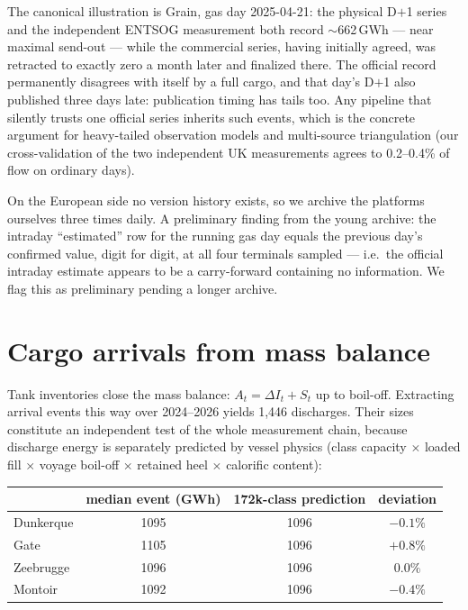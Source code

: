 \documentclass[11pt]{article}
\begin{document}
The canonical illustration is Grain, gas day 2025-04-21: the physical D$+$1
series and the independent ENTSOG measurement both record $\sim$662\,GWh
--- near maximal send-out --- while the commercial series, having initially
agreed, was retracted to exactly zero a month later and finalized there.
The official record permanently disagrees with itself by a full cargo, and
that day's D$+$1 also published three days late: publication timing has
tails too. Any pipeline that silently trusts one official series inherits
such events, which is the concrete argument for heavy-tailed observation
models and multi-source triangulation (our cross-validation of the two
independent UK measurements agrees to 0.2--0.4\% of flow on ordinary
days).

On the European side no version history exists, so we archive the
platforms ourselves three times daily. A preliminary finding from the
young archive: the intraday ``estimated'' row for the running gas day
equals the previous day's confirmed value, digit for digit, at all four
terminals sampled --- i.e.\ the official intraday estimate appears to be a
carry-forward containing no information. We flag this as preliminary
pending a longer archive.

\section{Cargo arrivals from mass balance}
\label{sec:arrivals}
Tank inventories close the mass balance: $A_t = \Delta I_t + S_t$ up to
boil-off. Extracting arrival events this way over 2024--2026 yields
1{,}446 discharges. Their sizes constitute an independent test of the
whole measurement chain, because discharge energy is separately predicted
by vessel physics (class capacity $\times$ loaded fill $\times$ voyage
boil-off $\times$ retained heel $\times$ calorific content):

\begin{center}\small
\begin{tabular}{lccc}
\toprule
& median event (GWh) & 172k-class prediction & deviation \\
\midrule
Dunkerque & 1095 & 1096 & $-0.1\%$ \\
Gate & 1105 & 1096 & $+0.8\%$ \\
Zeebrugge & 1096 & 1096 & $0.0\%$ \\
Montoir & 1092 & 1096 & $-0.4\%$ \\
\bottomrule
\end{tabular}
\end{center}
\end{document}
